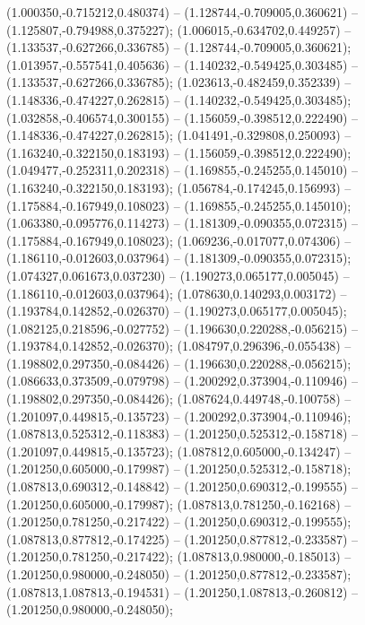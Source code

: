  (1.000350,-0.715212,0.480374) -- (1.128744,-0.709005,0.360621) -- (1.125807,-0.794988,0.375227);
 (1.006015,-0.634702,0.449257) -- (1.133537,-0.627266,0.336785) -- (1.128744,-0.709005,0.360621);
 (1.013957,-0.557541,0.405636) -- (1.140232,-0.549425,0.303485) -- (1.133537,-0.627266,0.336785);
 (1.023613,-0.482459,0.352339) -- (1.148336,-0.474227,0.262815) -- (1.140232,-0.549425,0.303485);
 (1.032858,-0.406574,0.300155) -- (1.156059,-0.398512,0.222490) -- (1.148336,-0.474227,0.262815);
 (1.041491,-0.329808,0.250093) -- (1.163240,-0.322150,0.183193) -- (1.156059,-0.398512,0.222490);
 (1.049477,-0.252311,0.202318) -- (1.169855,-0.245255,0.145010) -- (1.163240,-0.322150,0.183193);
 (1.056784,-0.174245,0.156993) -- (1.175884,-0.167949,0.108023) -- (1.169855,-0.245255,0.145010);
 (1.063380,-0.095776,0.114273) -- (1.181309,-0.090355,0.072315) -- (1.175884,-0.167949,0.108023);
 (1.069236,-0.017077,0.074306) -- (1.186110,-0.012603,0.037964) -- (1.181309,-0.090355,0.072315);
 (1.074327,0.061673,0.037230) -- (1.190273,0.065177,0.005045) -- (1.186110,-0.012603,0.037964);
 (1.078630,0.140293,0.003172) -- (1.193784,0.142852,-0.026370) -- (1.190273,0.065177,0.005045);
 (1.082125,0.218596,-0.027752) -- (1.196630,0.220288,-0.056215) -- (1.193784,0.142852,-0.026370);
 (1.084797,0.296396,-0.055438) -- (1.198802,0.297350,-0.084426) -- (1.196630,0.220288,-0.056215);
 (1.086633,0.373509,-0.079798) -- (1.200292,0.373904,-0.110946) -- (1.198802,0.297350,-0.084426);
 (1.087624,0.449748,-0.100758) -- (1.201097,0.449815,-0.135723) -- (1.200292,0.373904,-0.110946);
 (1.087813,0.525312,-0.118383) -- (1.201250,0.525312,-0.158718) -- (1.201097,0.449815,-0.135723);
 (1.087812,0.605000,-0.134247) -- (1.201250,0.605000,-0.179987) -- (1.201250,0.525312,-0.158718);
 (1.087813,0.690312,-0.148842) -- (1.201250,0.690312,-0.199555) -- (1.201250,0.605000,-0.179987);
 (1.087813,0.781250,-0.162168) -- (1.201250,0.781250,-0.217422) -- (1.201250,0.690312,-0.199555);
 (1.087813,0.877812,-0.174225) -- (1.201250,0.877812,-0.233587) -- (1.201250,0.781250,-0.217422);
 (1.087813,0.980000,-0.185013) -- (1.201250,0.980000,-0.248050) -- (1.201250,0.877812,-0.233587);
 (1.087813,1.087813,-0.194531) -- (1.201250,1.087813,-0.260812) -- (1.201250,0.980000,-0.248050);
